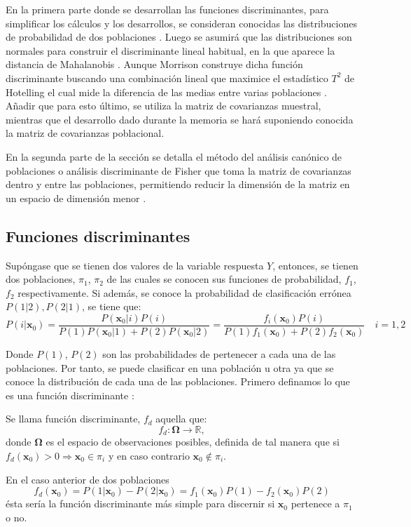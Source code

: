 \noindent En la primera parte donde se desarrollan las funciones discriminantes, para simplificar los cálculos y los desarrollos, se consideran conocidas las distribuciones de probabilidad de dos poblaciones \cite{Johnson 2007}. Luego se asumirá que las distribuciones son normales para construir el discriminante lineal habitual, en la que aparece la distancia de Mahalanobis \cite{Peña 2002}. Aunque Morrison  construye dicha función discriminante buscando una combinación lineal que maximice el estadístico $T^2$ de Hotelling el cual mide la diferencia de las medias entre varias poblaciones \cite{ Johnson 2007, Mardia 1979, Morrison 1976}. Añadir que para esto último, se utiliza la matriz de covarianzas muestral, mientras que el desarrollo dado durante la memoria se hará suponiendo conocida la matriz de covarianzas poblacional.  

\noindent En la segunda parte de la sección se detalla el método del análisis canónico de poblaciones o análisis discriminante de Fisher que toma la matriz de covarianzas dentro y entre las poblaciones, permitiendo reducir la dimensión de la matriz en un espacio de dimensión menor \cite{Lebart 1984}. 

\subsection{Funciones discriminantes}

\noindent Supóngase que se tienen dos valores de la variable respuesta $Y$, entonces, se tienen dos poblaciones, $\pi_1$, $\pi_2$ de las cuales se conocen sus funciones de probabilidad, $f_1$, $f_2$ respectivamente. Si además, se conoce la probabilidad de clasificación errónea $P(1|2),P(2|1)$, se tiene que:
\begin{equation}
P(i|\textbf{x}_0)=\dfrac{P(\textbf{x}_0|i)P(i)}{P(1)P(\textbf{x}_0|1)+P(2)P(\textbf{x}_0|2)}=\dfrac{f_i(\mathbf{x}_0)P(i)}{P(1)f_1(\mathbf{x}_0)+P(2)f_2(\mathbf{x}_0)} \quad i=1,2
\end{equation}

\noindent Donde $P(1)$, $P(2)$ son las probabilidades de pertenecer a cada una de las poblaciones. Por tanto, se puede clasificar en una población u otra ya que se conoce la distribución de cada una de las poblaciones. Primero definamos lo que es una función discriminante \cite{Cuadras 2014}:

\begin{defi}
Se llama función discriminante, $f_{d}$ aquella que:
\begin{equation}
f_{d}:\mathbf{\Omega}\longrightarrow \mathbb{R},
\end{equation}
donde $\mathbf{\Omega}$ es el espacio de observaciones posibles, definida de tal manera que si $f_{d}(\textbf{x}_0)>0\Rightarrow \textbf{x}_0\in \pi_i$ y en caso contrario $\textbf{x}_0\notin \pi_i$. 
\end{defi}
\noindent En el caso anterior de dos poblaciones
\begin{equation}
 f_d(\mathbf{x}_0)=P(1|\mathbf{x}_0)-P(2|\mathbf{x}_0)=f_1(\textbf{x}_0)P(1)-f_2(\textbf{x}_0)P(2)
\end{equation} 
ésta sería la función discriminante más simple  para discernir si $\textbf{x}_0$ pertenece a $\pi_1$ o no.

